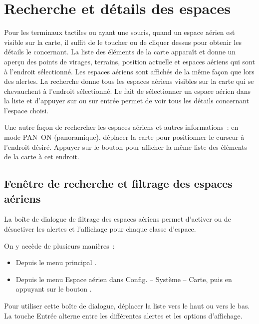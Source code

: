 \section{Recherche et détails des espaces}\label{sec:airspacedetails}

Pour les terminaux tactiles ou ayant une souris, quand un espace aérien est visible sur la carte, il suffit de le toucher ou de cliquer dessus pour obtenir les détails le concernant. La liste des éléments de la carte apparaît et donne un aperçu des points de virages, terrains, position actuelle et espaces aériens qui sont à l'endroit sélectionné. Les espaces aériens sont affichés de la même façon que lors des alertes. La recherche donne tous les espaces aériens visibles sur la carte qui se chevauchent à l'endroit sélectionné.
Le fait de sélectionner un espace aérien dans la liste et d'appuyer sur  ou sur entrée permet de voir tous les détails concernant l'espace choisi.

\tip Une autre façon de rechercher les espaces aériens et autres informations~: en mode PAN~ON (panoramique), déplacer la carte pour positionner le curseur à l'endroit désiré.  Appuyer sur le bouton   pour afficher la même liste des éléments de la carte à cet endroit.



\subsection*{Fenêtre de recherche et filtrage des espaces aériens}\label{sec:airspace-filter}

La boîte de dialogue de filtrage des espaces aériens permet d'activer ou de désactiver les alertes et l'affichage pour chaque classe d'espace.

On y accède de plusieurs manières~:
\begin{itemize}
\item Depuis le menu principal \blink{}.
\item Depuis le menu Espace aérien dans Config. -- Système -- Carte, puis en appuyant sur le bouton .
\end{itemize}

Pour utiliser cette boîte de dialogue, déplacer la liste vers le haut ou vers le bas. La touche Entrée alterne entre les différentes alertes et les options d'affichage.

